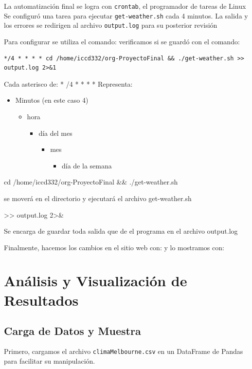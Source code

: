 \documentclass[11pt]{article}
\begin{document}
La automatización final se logra con \texttt{crontab}, el programador de tareas de Linux
Se configuró una tarea para ejecutar \texttt{get-weather.sh} cada 4 minutos.
La salida y los errores se redirigen al archivo \texttt{output.log} para su posterior revisión


Para configurar se utiliza el comando:
verificamos si se guardó con el comando:

\begin{verbatim}
*/4 * * * * cd /home/iccd332/org-ProyectoFinal && ./get-weather.sh >> output.log 2>&1
\end{verbatim}


Cada asterisco de: * /4 * * * *
Representa:
\begin{itemize}
\item Minutos (en este caso 4)
\begin{itemize}
\item hora
\begin{itemize}
\item día del mes
\begin{itemize}
\item mes
\begin{itemize}
\item día de la semana
\end{itemize}
\end{itemize}
\end{itemize}
\end{itemize}
\end{itemize}
cd /home/iccd332/org-ProyectoFinal \&\& ./get-weather.sh

se moverá en el directorio y ejecutará el archivo get-weather.sh

>> output.log 2>\&

Se encarga de guardar toda salida que de el programa en el archivo output.log


Finalmente, hacemos los cambios en el sitio web con:
y lo mostramos con:
\section{Análisis y Visualización de Resultados}
\label{sec:orga842572}

\subsection{Carga de Datos y Muestra}
\label{sec:orgc98d313}

Primero, cargamos el archivo \texttt{climaMelbourne.csv} en un DataFrame de Pandas para facilitar su manipulación.
\end{document}
